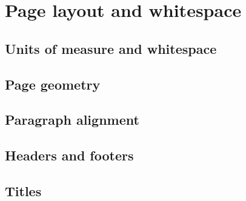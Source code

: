 \chapter{Page layout and whitespace}

\section{Units of measure and whitespace}


\section{Page geometry}



\section{Paragraph alignment}

\section{Headers and footers}

\section{Titles}
